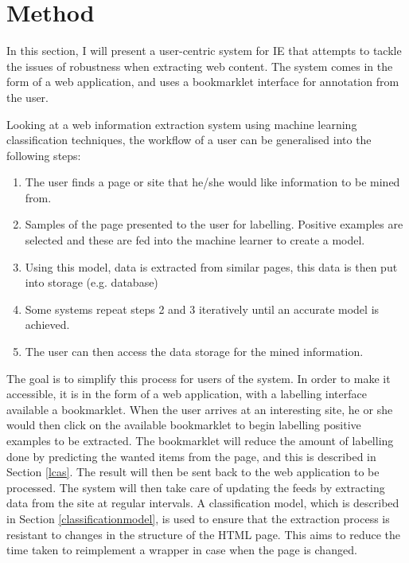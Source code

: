 \chapter{Method}
In this section, I will present a user-centric system for IE that attempts to tackle the issues of robustness when extracting web content. The system comes in the form of a web application, and uses a bookmarklet interface for annotation from the user.

Looking at a web information extraction system using machine learning classification techniques, the workflow of a user can be generalised into the following steps:
\begin{enumerate}
	\item The user finds a page or site that he/she would like information to be mined from.
	\item Samples of the page presented to the user for labelling. Positive examples are selected and these are fed into the machine learner to create a model.
	\item Using this model, data is extracted from similar pages, this data is then put into storage (e.g. database)
	\item Some systems repeat steps 2 and 3 iteratively until an accurate model is achieved.
	\item The user can then access the data storage for the mined information.
\end{enumerate}

The goal is to simplify this process for users of the system. In order to make it accessible, it is in the form of a web application, with a labelling interface available a bookmarklet. When the user arrives at an interesting site, he or she would then click on the available bookmarklet to begin labelling positive examples to be extracted. The bookmarklet will reduce the amount of labelling done by predicting the wanted items from the page, and this is described in Section \ref{lcas}. The result will then be sent back to the web application to be processed.
The system will then take care of updating the feeds by extracting data from the site at regular intervals. A classification model, which is described in Section \ref{classificationmodel}, is used to ensure that the extraction process is resistant to changes in the structure of the HTML page. This aims to reduce the time taken to reimplement a wrapper in case when the page is changed.

